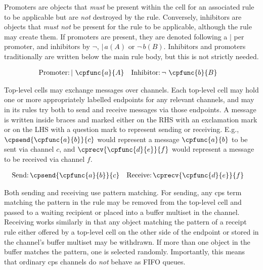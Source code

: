 Promoters are objects that \emph{must} be present within the cell for an associated rule to be applicable but are \emph{not} destroyed by the rule.  Conversely, inhibitors are objects that \emph{must not} be present for the rule to be applicable, although the rule may create them.  If promoters are present, they are denoted following a \(|\) per promoter, and inhibitors by \(\neg\), \eg{} \(|\,a(A)\) or \(\neg\,b(B)\).  Inhibitors and promoters traditionally are written below the main rule body, but this is not strictly needed.

\begin{framed}
\vspace{-1.1cm}
\begin{align*}
    \text{Promoter:}&\, | ~ \cpfunc{a}{A} & \text{Inhibitor:}&\, \neg ~ \cpfunc{b}{B}
\end{align*}
\vspace{-0.8cm}
\end{framed}

Top-level cells may exchange messages over channels.  Each top-level cell may hold one or more appropriately labelled endpoints for any relevant channels, and may in its rules try both to send and receive messages via those endpoints.  A message is written inside braces and marked either on the RHS with an exclamation mark or on the LHS with a question mark to represent sending or receiving.  E.g., \(\cpsend{\cpfunc{a}{b}}{c}\) would represent a message \(\cpfunc{a}{b}\) to be sent via channel \(c\), and \(\cprecv{\cpfunc{d}{e}}{f}\) would represent a message to be received via channel \(f\).

\begin{framed}
\vspace{-1.1cm}
\begin{align*}
    \text{Send:}&\, \cpsend{\cpfunc{a}{b}}{c} & \text{Receive:}&\, \cprecv{\cpfunc{d}{e}}{f}
\end{align*}
\vspace{-0.8cm}
\end{framed}

Both sending and receiving use pattern matching.  For sending, any \gls{cps} term matching the pattern in the rule may be removed from the top-level cell and passed to a waiting recipient or placed into a buffer multiset in the channel.  Receiving works similarly in that any object matching the pattern of a receipt rule either offered by a top-level cell on the other side of the endpoint or stored in the channel's buffer multiset may be withdrawn.  If more than one object in the buffer matches the pattern, one is selected randomly.  Importantly, this means that ordinary \gls{cps} channels do \emph{not} behave as FIFO queues.

